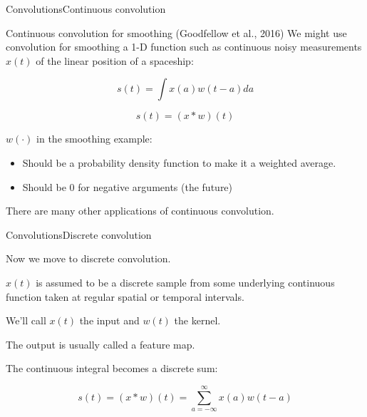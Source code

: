\documentclass[aspectratio=169]{beamer}
\begin{document}
\begin{frame}{Convolutions}{Continuous convolution}

\begin{block}{Continuous convolution for smoothing (Goodfellow et al., 2016)}
We might use convolution for smoothing a 1-D function such as
continuous noisy measurements $x(t)$ of the linear position of a
spaceship:

$$ s(t) = \int x(a) w(t-a) da $$

$$ s(t) = (x * w)(t) $$

\end{block}

$w(\cdot)$ in the smoothing example:
\begin{itemize}
  \item Should be a
\alert{probability density function} to make it a \alert{weighted average}.
\item Should be \alert{0} for negative arguments (the future)
\end{itemize}

\medskip

There are many other applications of continuous convolution.

\end{frame}


\begin{frame}{Convolutions}{Discrete convolution}

  Now we move to \alert{discrete} convolution.

  $x(t)$ is assumed to be a discrete sample from some underlying
  continuous function taken at regular spatial or temporal intervals.

  \medskip
  
  We'll call $x(t)$ the \alert{input} and $w(t)$ the \alert{kernel}.

  \medskip

  The output is usually called a \alert{feature map}.

  \medskip
  
  The continuous integral becomes a \alert{discrete sum}:

  $$ s(t) = (x * w)(t) = \sum_{a = -\infty}^{\infty} x(a) w(t-a) $$

\end{frame}
\end{document}
